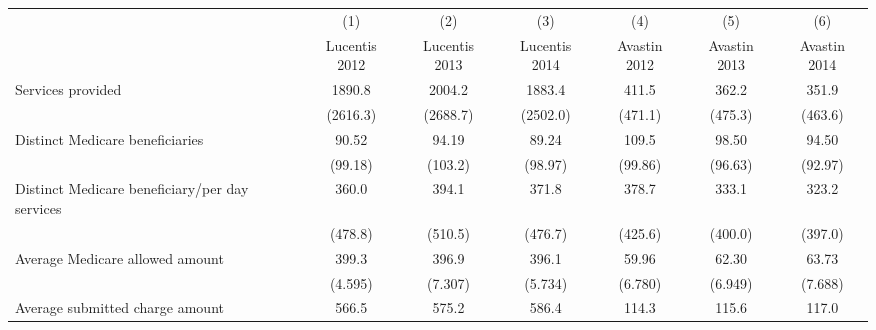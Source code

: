 \def\sym#1{\ifmmode^{#1}\else\(^{#1}\)\fi}
\begin{adjustbox}{max
width={\textwidth},caption={Summary Statistics, Lucentis and Avastin\label{table:lucentisavastinsum}},nofloat=table}
\begin{tabular}{l*{6}{c}}
\toprule
                    &\multicolumn{1}{c}{(1)}&\multicolumn{1}{c}{(2)}&\multicolumn{1}{c}{(3)}&\multicolumn{1}{c}{(4)}&\multicolumn{1}{c}{(5)}&\multicolumn{1}{c}{(6)}\\
                    &\multicolumn{1}{c}{Lucentis 2012}&\multicolumn{1}{c}{Lucentis 2013}&\multicolumn{1}{c}{Lucentis 2014}&\multicolumn{1}{c}{Avastin 2012}&\multicolumn{1}{c}{Avastin 2013}&\multicolumn{1}{c}{Avastin 2014}\\
\midrule
Services provided   &      1890.8         &      2004.2         &      1883.4         &       411.5         &       362.2         &       351.9         \\
                    &    (2616.3)         &    (2688.7)         &    (2502.0)         &     (471.1)         &     (475.3)         &     (463.6)         \\
\addlinespace
Distinct Medicare beneficiaries&       90.52         &       94.19         &       89.24         &       109.5         &       98.50         &       94.50         \\
                    &     (99.18)         &     (103.2)         &     (98.97)         &     (99.86)         &     (96.63)         &     (92.97)         \\
\addlinespace
Distinct Medicare beneficiary/per day services&       360.0         &       394.1         &       371.8         &       378.7         &       333.1         &       323.2         \\
                    &     (478.8)         &     (510.5)         &     (476.7)         &     (425.6)         &     (400.0)         &     (397.0)         \\
\addlinespace
Average Medicare allowed amount&       399.3         &       396.9         &       396.1         &       59.96         &       62.30         &       63.73         \\
                    &     (4.595)         &     (7.307)         &     (5.734)         &     (6.780)         &     (6.949)         &     (7.688)         \\
\addlinespace
Average submitted charge amount&       566.5         &       575.2         &       586.4         &       114.3         &       115.6         &       117.0         \\

\end{tabular}
\end{adjustbox}
